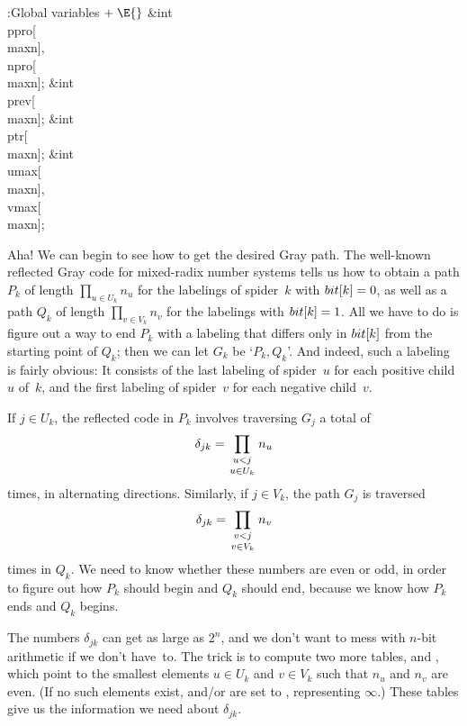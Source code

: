 \Y\B\4:Global variables\X${}\mathrel+\E{}$\6
\&{int} \\{ppro}[\\{maxn}]${},{}$ \\{npro}[\\{maxn}];\6
\&{int} \\{prev}[\\{maxn}];\6
\&{int} \\{ptr}[\\{maxn}];\6
\&{int} \\{umax}[\\{maxn}]${},{}$ \\{vmax}[\\{maxn}];\par
\fi

Aha! We can begin to see how to get the desired Gray path.
The well-known
reflected Gray code for mixed-radix number systems tells us how to obtain a
path $P_k$ of length $\prod_{u\in U_k}n_u$ for the labelings of
spider~$k$ with $\\{bit}[k]=0$, as
well as a path $Q_k$ of length $\prod_{v\in V_k}n_v$ for the labelings with
$\\{bit}[k]=1$. All we have to do is figure out a way to end $P_k$ with
a labeling that differs only in $\\{bit}[k]$ from the starting point of $Q_k$;
then we can let $G_k$ be `$P_k, Q_k$'. And indeed, such a labeling
is fairly obvious: It consists of the last labeling of spider~$u$ for
each positive child $u$ of~$k$, and the first labeling of spider~$v$ for
each negative child~$v$.

If $j\in U_k$, the reflected code in $P_k$ involves traversing $G_j$
a total of
$$\delta_{jk}=
\prod_{\scriptstyle u<j_{\mathstrut}\atop\scriptstyle u\in U_k}n_u$$
times, in alternating directions. Similarly, if $j\in V_k$, the path $G_j$
is traversed
$$\delta_{jk}=
\prod_{\scriptstyle v<j_{\mathstrut}\atop\scriptstyle v\in V_k}n_v$$
times in $Q_k$. We need to know whether these numbers are even or odd,
in order to figure out how $P_k$ should begin and $Q_k$ should end,
because we know how $P_k$ ends and $Q_k$ begins.

The numbers $\delta_{jk}$ can get as large as $2^n$, and we don't want to
mess with $n$-bit arithmetic if we don't have~to.
The trick is to compute two more tables,  and ,
which point to the smallest elements $u\in U_k$ and $v\in V_k$ such that
$n_u$ and $n_v$ are even. (If no such elements exist,
 and/or  are set to ,
representing $\infty$.)
These tables give us the information we need about $\delta_{jk}$.

